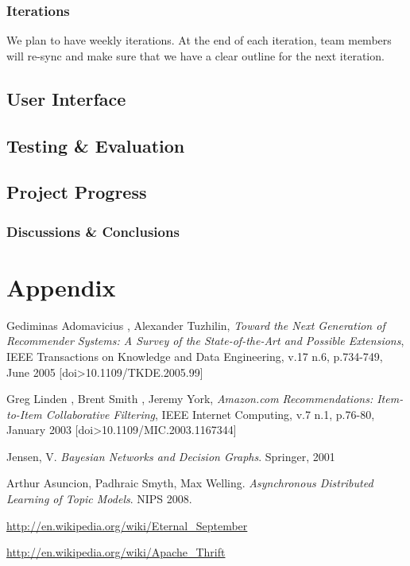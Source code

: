 \documentclass[11pt,letterpaper]{article}
\begin{document}
\subsubsection{Iterations}
We plan to have weekly iterations.
At the end of each iteration, team members will re-sync and make sure that we have a clear outline for the next iteration.

\subsection{User Interface}

\subsection{Testing \& Evaluation}

\subsection{Project Progress}

\subsubsection{Discussions \& Conclusions}

\section{Appendix}

\newpage
\newpage
\begin{thebibliography}{6}
   Gediminas Adomavicius , Alexander Tuzhilin, \textit{Toward the Next Generation of Recommender Systems: A Survey of the State-of-the-Art and Possible Extensions}, IEEE Transactions on Knowledge and Data Engineering, v.17 n.6, p.734-749, June 2005  [doi>10.1109/TKDE.2005.99]

   Greg Linden , Brent Smith , Jeremy York, \textit{Amazon.com Recommendations: Item-to-Item Collaborative Filtering}, IEEE Internet Computing, v.7 n.1, p.76-80, January 2003  [doi>10.1109/MIC.2003.1167344]

   Jensen, V. \textit{Bayesian Networks and Decision Graphs}. Springer, 2001

   Arthur Asuncion, Padhraic Smyth, Max Welling. \textit{Asynchronous Distributed Learning of Topic Models}. NIPS 2008.

   \url{http://en.wikipedia.org/wiki/Eternal\_September}

   \url{http://en.wikipedia.org/wiki/Apache\_Thrift}

\end{thebibliography}
\end{document}
